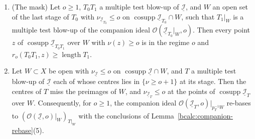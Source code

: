 \begin{lemma}
\begin{enumerate}
\item (The mask) Let \(o\ge1\), \(T_0T_1\) a multiple test blow-up of \(\underline{\mathcal I}\), and \(W\) an open set of the last stage of \(T_0\) with
\(\nu_{\underline{\mathcal I}_{T_0}}\le o\) on \(\operatorname{cosupp}\underline{\mathcal I}_{T_0}\cap W\), such that \(T_1|_W\) is a multiple test blow-up of the
companion ideal \(\mathcal O(\underline{\mathcal I}_{T_0}|_W,o)\). Then every point \(z\) of \(\operatorname{cosupp}\underline{\mathcal I}_{T_0T_1}\) over \(W\) with
\(\nu(z)\ge o\) is in the regime \(o\) and \(r_o(T_0T_1,z)\ge\operatorname{length}T_1\).
\item Let \(W\subset X\) be open with \(\nu_{\underline{\mathcal I}}\le o\) on \(\operatorname{cosupp}\underline{\mathcal I}\cap W\), and \(T\) a multiple test blow-up of
\(\underline{\mathcal I}\) each of whose centres lies in \(\{\nu\ge o+1\}\) at its stage. Then the centres of \(T\) miss the preimages of \(W\), and
\(\nu_{\underline{\mathcal I}_T}\le o\) at the points of \(\operatorname{cosupp}\underline{\mathcal I}_T\) over \(W\). Consequently, for \(o\ge1\), the companion ideal
\(\mathcal O(\underline{\mathcal I}_T,o)|_{p_T^{-1}W}\) re-bases to \((\mathcal O(\underline{\mathcal I},o)|_W)_{T|_W}\) with the conclusions of
Lemma~\ref{bcalc:companion-rebase}(5).
\end{enumerate}
\end{lemma}
